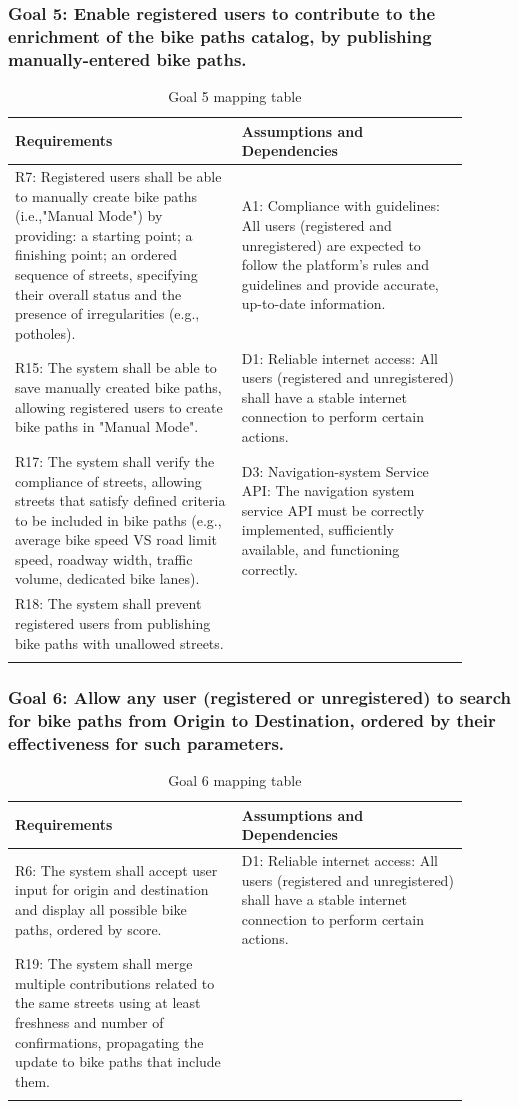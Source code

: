 \documentclass{Configuration_Files/PoliMi3i_thesis}
\begin{document}
    \subsubsection*{Goal 5: Enable registered users to contribute to the enrichment of the bike paths catalog, by publishing manually-entered bike paths.}
    \begin{longtable}{|p{0.45\linewidth}|p{0.45\linewidth}|}
    \hline
    \textbf{Requirements} & \textbf{Assumptions and Dependencies} \\ \hline
    R7: Registered users shall be able to manually create bike paths (i.e.,"Manual Mode") by providing: a starting point; a finishing point; an ordered sequence of streets, specifying their overall status and the presence of irregularities (e.g., potholes).&A1: Compliance with guidelines: All users (registered and unregistered) are expected to follow the platform’s rules and guidelines and provide accurate, up-to-date information.\\
    R15: The system shall be able to save manually created bike paths, allowing registered users to create bike paths in "Manual Mode".&D1: Reliable internet access: All users (registered and unregistered) shall have a stable internet connection to perform certain actions.\\
    R17: The system shall verify the compliance of streets, allowing streets that satisfy defined criteria to be included in bike paths (e.g., average bike speed VS road limit speed, roadway width, traffic volume, dedicated bike lanes).&D3: Navigation-system Service API: The navigation system service API must be correctly implemented, sufficiently available, and functioning correctly.\\
    R18: The system shall prevent registered users from publishing bike paths with unallowed streets.&\\
    \hline
    \caption{Goal 5 mapping table}
    \end{longtable}
    
    \subsubsection*{Goal 6: Allow any user (registered or unregistered) to search for bike paths from Origin to Destination, ordered by their effectiveness for such parameters.}
    \begin{longtable}{|p{0.45\linewidth}|p{0.45\linewidth}|}
    \hline
    \textbf{Requirements} & \textbf{Assumptions and Dependencies} \\ \hline
    R6: The system shall accept user input for origin and destination and display all possible bike paths, ordered by score.&D1: Reliable internet access: All users (registered and unregistered) shall have a stable internet connection to perform certain actions.\\
    R19: The system shall merge multiple contributions related to the same streets using at least freshness and number of confirmations, propagating the update to bike paths that include them.&\\
    \hline
    \caption{Goal 6 mapping table}
    \end{longtable}
    
\end{document}
